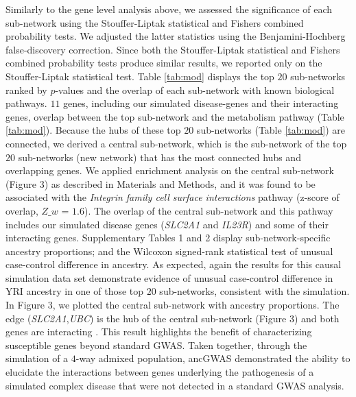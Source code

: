 \documentclass[10pt]{article}
\begin{document}
Similarly to the gene level analysis above, we assessed the significance of each sub-network using the Stouffer-Liptak statistical and Fishers combined probability tests. We adjusted the latter statistics using the Benjamini-Hochberg false-discovery correction. Since both the Stouffer-Liptak statistical and Fishers combined probability tests produce similar results, we reported only on the Stouffer-Liptak statistical test. Table \ref{tab:mod} displays the top $20$ sub-networks ranked by $p$-values and the overlap of each sub-network with known biological pathways. $11$ genes, including our simulated disease-genes and their interacting genes, overlap between the top sub-network and the metabolism pathway (Table \ref{tab:mod}). Because the hubs of these top $20$ sub-networks (Table \ref{tab:mod}) are connected, we derived a central sub-network, which is the sub-network of the top $20$ sub-networks (new network) that has the most connected hubs and overlapping genes. We applied enrichment analysis on the central sub-network (Figure 3) as described in Materials and Methods, and it was found to be associated with the \textit{Integrin family cell surface interactions} pathway (z-score of overlap, $Z\_w$ = $1.6$). The overlap of the central sub-network and this pathway includes our simulated disease genes (\textit{SLC2A1} and \textit{IL23R}) and some of their interacting genes. Supplementary Tables 1 and 2 display sub-network-specific ancestry proportions; and the Wilcoxon signed-rank statistical test of unusual case-control difference in ancestry. As expected, again the results for this causal simulation data set demonstrate evidence of unusual case-control difference in YRI ancestry in one of those top $20$ sub-networks, consistent with the simulation. In Figure 3, we plotted the central sub-network with ancestry proportions. The edge (\textit{SLC2A1},\textit{UBC}) is the hub of the central sub-network (Figure 3) and both genes are interacting \cite{wu,cowy}. This result highlights the benefit of characterizing susceptible genes beyond standard GWAS. Taken together, through the simulation of a $4$-way admixed population, ancGWAS demonstrated the ability to elucidate the interactions between genes underlying the pathogenesis of a simulated complex disease that were not detected in a standard GWAS analysis. 
\end{document}
